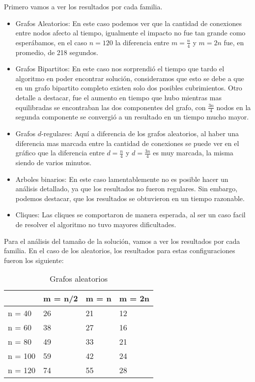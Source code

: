 \newpage
Primero vamos a ver los resultados por cada familia.

\begin{itemize}
	\item Grafos Aleatorios: En este caso podemos ver que la cantidad de conexiones entre nodos afecto al tiempo, igualmente el impacto no fue tan grande como esperábamos, en el caso $n = 120$ la diferencia entre $m = \frac{n}{4}$ y $m = 2n$ fue, en promedio, de 218 segundos.
	\item Grafos Bipartitos: En este caso nos sorprendió el tiempo que tardo el algoritmo en poder encontrar solución, consideramos que esto se debe a que en un grafo bipartito completo existen solo dos posibles cubrimientos. Otro detalle a destacar, fue el aumento en tiempo que hubo mientras mas equilibradas se encontraban las dos componentes del grafo, con $\frac{3n}{4}$ nodos en la segunda componente se convergió a un resultado en un tiempo mucho mayor.
	\item Grafos $d$-regulares: Aquí a diferencia de los grafos aleatorios, al haber una diferencia mas marcada entre la cantidad de conexiones se puede ver en el gráfico que la diferencia entre $d = \frac{n}{4}$ y $d = \frac{3n}{4}$ es muy marcada, la misma siendo de varios minutos.
	\item Arboles binarios: En este caso lamentablemente no es posible hacer un análisis detallado, ya que los resultados no fueron regulares. Sin embargo, podemos destacar, que los resultados se obtuvieron en un tiempo razonable.
	\item Cliques: Las cliques se comportaron de manera esperada, al ser un caso facil de resolver el algoritmo no tuvo mayores dificultades.
\end{itemize}

Para el análisis del tamaño de la solución, vamos a ver los resultados por cada familia. En el caso de los aleatorios, los resultados para estas configuraciones fueron los siguiente:

\begin{table}[]
\centering
\caption{Grafos aleatorios}
\label{my-label}
\begin{tabular}{|l|lll|}
\hline
        & \multicolumn{1}{l|}{m = n/2} & \multicolumn{1}{l|}{m = n} & m = 2n \\ \hline
n = 40  & 26                           & 21                         & 12     \\ \cline{1-1}
n = 60  & 38                           & 27                         & 16     \\ \cline{1-1}
n = 80  & 49                           & 33                         & 21     \\ \cline{1-1}
n = 100 & 59                           & 42                         & 24     \\ \cline{1-1}
n = 120 & 74                           & 55                         & 28     \\ \hline
\end{tabular}
\end{table}

